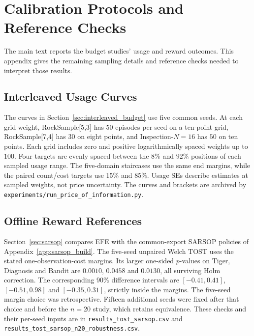 \section{Calibration Protocols and Reference Checks}
\label{app:extended_budget_evidence}

The main text reports the budget studies' usage and reward outcomes. This appendix gives the remaining sampling details and reference checks needed to interpret those results.

\subsection{Interleaved Usage Curves}
\label{app:interleaved_details}

The curves in Section~\ref{sec:interleaved_budget} use five common seeds. At each grid weight, RockSample[5,3] has $50$ episodes per seed on a ten-point grid, RockSample[7,4] has $30$ on eight points, and Inspection-$N=16$ has $50$ on ten points. Each grid includes zero and positive logarithmically spaced weights up to $100$. Four targets are evenly spaced between the $8\%$ and $92\%$ positions of each sampled usage range. The five-domain staircases use the same end margins, while the paired count/cost targets use $15\%$ and $85\%$. Usage SEs describe estimates at sampled weights, not price uncertainty. The curves and brackets are archived by \texttt{experiments/\allowbreak run\_\allowbreak price\_\allowbreak of\_\allowbreak information.py}.

\subsection{Offline Reward References}
\label{app:sarsop_details}
\label{app:cpomdp_details}

Section~\ref{sec:sarsop} compares EFE with the common-export SARSOP policies of Appendix~\ref{app:sarsop_build}. The five-seed unpaired Welch TOST uses the stated one-observation-cost margins. Its larger one-sided $p$-values on Tiger, Diagnosis and Bandit are $0.0010$, $0.0458$ and $0.0130$, all surviving Holm correction. The corresponding $90\%$ difference intervals are $[-0.41,0.41]$, $[-0.51,0.98]$ and $[-0.35,0.31]$, strictly inside the margins. The five-seed margin choice was retrospective. Fifteen additional seeds were fixed after that choice and before the $n=20$ study, which retains equivalence. These checks and their per-seed inputs are in \texttt{results\_\allowbreak tost\_\allowbreak sarsop.csv} and \texttt{results\_\allowbreak tost\_\allowbreak sarsop\_\allowbreak n20\_\allowbreak robustness.csv}.

